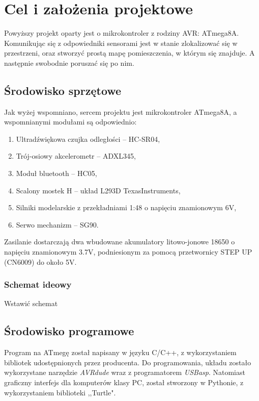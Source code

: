 \section{Cel i założenia projektowe}
    \tab Powyższy projekt oparty jest o mikrokontroler z rodziny AVR: ATmega8A.
    Komunikując się z odpowiedniki sensorami jest w stanie zlokalizować się w przestrzeni,
    oraz stworzyć prostą mapę pomieszczenia, w którym się znajduje. A następnie swobodnie poruszać się po nim.

    \subsection{Środowisko sprzętowe}
        \tab Jak wyżej wspomniano, sercem projektu jest mikrokontroler ATmega8A, a wspomnianymi modułami są odpowiednio:
        \begin{enumerate}
            \item Ultradźwiękowa czujka odległości -- HC-SR04,
            \item Trój-osiowy akcelerometr -- ADXL345,
            \item Moduł bluetooth -- HC05,
            \item Scalony mostek H -- układ L293D TexasInstruments,
            \item Silniki modelarskie z przekładniami 1:48 o napięciu znamionowym 6V,
            \item Serwo mechanizm -- SG90.
        \end{enumerate}
% 
        Zasilanie dostarczają dwa wbudowane akumulatory litowo-jonowe 18650 o napięciu znamionowym 3.7V, podniesionym za pomocą przetwornicy STEP UP (CN6009) do około 5V.


        \subsubsection{Schemat ideowy}
            Wstawić schemat
        
    \subsection{Środowisko programowe}
        \tab Program na ATmegę został napisany w języku C/C++, z wykorzystaniem bibliotek udostępnionych przez producenta.
        Do programowania, układu zostało wykorzystane narzędzie \textit{AVRdude} wraz z programatorem \textit{USBasp}.
        Natomiast graficzny interfejs dla komputerów klasy PC, został stworzony w Pythonie, z wykorzystaniem biblioteki ,,Turtle".

